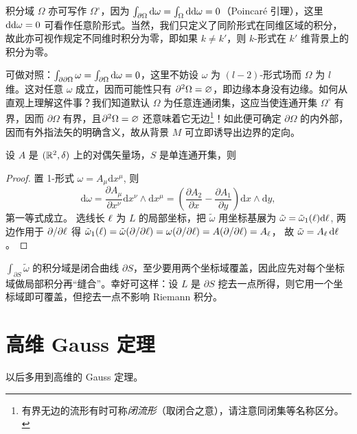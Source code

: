 积分域 $\Omega$ 亦可写作 $\Omega^\circ$，因为 $\int_{\partial\Omega}\dd\omega=\int_\Omega \dd\dd\omega=0$（Poincaré 引理），这里$\dd\dd\omega=0$ 可看作任意阶形式。当然，我们只定义了同阶形式在同维区域的积分，故此亦可视作规定不同维时积分为零，即如果 $k\neq k'$，则 $k$-形式在 $k'$ 维背景上的积分为零。

可做对照：$\int_{\partial\partial\Omega}\omega=\int_{\partial\Omega} \dd\omega=0$，这里不妨设 $\omega$ 为 $(l-2)$-形式场而 $\Omega$ 为 $l$ 维。这对任意 $\omega$ 成立，因而可能性只有 $\partial^2\Omega=\varnothing$，即边缘本身没有边缘。如何从直观上理解这件事？我们知道默认 $\Omega$ 为任意连通闭集，这应当使连通开集 $\Omega^\circ$ 有界，因而 $\partial\Omega$ 有界，且$\partial^2\Omega=\varnothing$ 还意味着它无边\footnote{有界无边的流形有时可称\textit{闭流形}（取闭合之意），请注意同闭集等名称区分。}！如此便可确定 $\partial\Omega$ 的内外部，因而有外指法矢的明确含义，故从背景 $M$ 可立即诱导出边界的定向。

\begin{eg}[Green]
    设 $A$ 是 $(\mathbb{R}^2,\delta)$ 上的对偶矢量场，$S$ 是单连通开集，则
\end{eg}
\begin{proof}
    置 1-形式 $\omega=A_\mu\mathrm{d} x^\mu$, 则
\[\mathrm{d} \omega  =\frac{\partial A_\mu}{\partial x^\nu} \mathrm{d} x^\nu \wedge \mathrm{d} x^\mu=\left(\frac{\partial A_2}{\partial x}-\frac{\partial A_1}{\partial y}\right) \mathrm{d} x \wedge \mathrm{d} y,\]
第一等式成立。
选线长 $\ell$ 为 $L$ 的局部坐标，把 $\tilde{\omega}$ 用坐标基展为 $\tilde{\omega}=\tilde{\omega}_1(\ell)\mathrm{d} \ell$, 两边作用于 $\partial / \partial \ell$ 得
$\tilde{\omega}_1(\ell)=\tilde{\omega}(\partial / \partial \ell)=\omega(\partial / \partial \ell)=A(\partial / \partial \ell)=A_\ell$，
故 $\tilde{\omega}=A_\ell\, \mathrm{d} \ell$。
\end{proof}
\begin{remark}
    $\int_{\partial S} \tilde{\omega}$ 的积分域是闭合曲线 $\partial S$，至少要用两个坐标域覆盖，因此应先对每个坐标域做局部积分再“缝合”。幸好可这样：设 $L$ 是 $\partial S$ 挖去一点所得，则它用一个坐标域即可覆盖，但挖去一点不影响 Riemann 积分。
\end{remark}


\section{高维 Gauss 定理}
以后多用到高维的 Gauss 定理。



